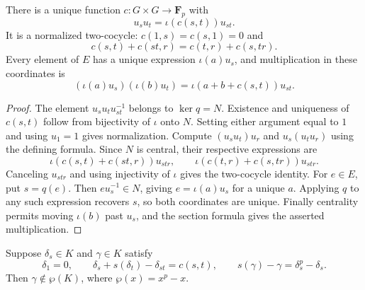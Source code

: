 \begin{lemma}
\label{lem:central-extension-factor-set}
\leanok
There is a unique function $c:G\times G\to\mathbf F_p$ with
\[
 u_su_t=\iota(c(s,t))u_{st}.
\]
It is a normalized two-cocycle:
$c(1,s)=c(s,1)=0$ and
\[
 c(s,t)+c(st,r)=c(t,r)+c(s,tr).
\]
Every element of $E$ has a unique expression $\iota(a)u_s$,
and multiplication in these coordinates is
\[
 (\iota(a)u_s)(\iota(b)u_t)
   =\iota(a+b+c(s,t))u_{st}.
\]
\end{lemma}

\begin{proof}
The element $u_su_tu_{st}^{-1}$ belongs to $\ker q=N$.
Existence and uniqueness of $c(s,t)$ follow from bijectivity
of $\iota$ onto $N$. Setting either argument equal to $1$
and using $u_1=1$ gives normalization.
Compute $(u_su_t)u_r$ and $u_s(u_tu_r)$ using the defining
formula. Since $N$ is central, their respective expressions are
\[
 \iota(c(s,t)+c(st,r))u_{str},\qquad
 \iota(c(t,r)+c(s,tr))u_{str}.
\]
Canceling $u_{str}$ and using injectivity of $\iota$ gives
the two-cocycle identity.
For $e\in E$, put $s=q(e)$. Then $eu_s^{-1}\in N$, giving
$e=\iota(a)u_s$ for a unique $a$. Applying $q$ to any such
expression recovers $s$, so both coordinates are unique.
Finally centrality permits moving $\iota(b)$ past $u_s$,
and the section formula gives the asserted multiplication.
\end{proof}

\begin{lemma}
\label{lem:witt-frattini-parameter-not-image}
\leanok
Suppose $\delta_s\in K$ and $\gamma\in K$ satisfy
\[
 \delta_1=0,\qquad
 \delta_s+s(\delta_t)-\delta_{st}=c(s,t),\qquad
 s(\gamma)-\gamma=\delta_s^p-\delta_s.
\]
Then $\gamma\notin\wp(K)$, where $\wp(x)=x^p-x$.
\end{lemma}


